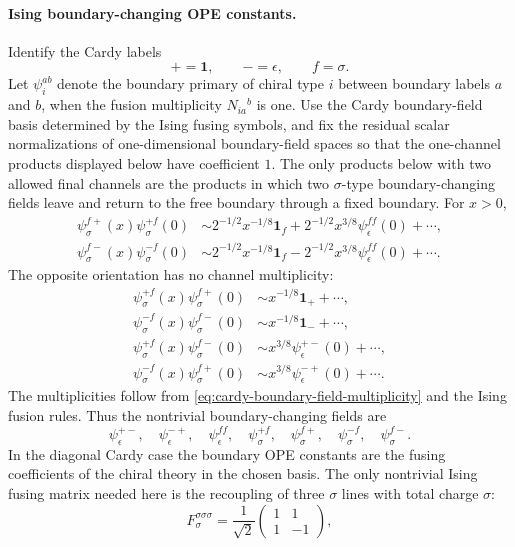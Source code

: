 \paragraph{Ising boundary-changing OPE constants.}
Identify the Cardy labels
\[
  +=\mathbf 1,\qquad -=\epsilon,\qquad f=\sigma .
\]
Let \(\psi_i^{ab}\) denote the boundary primary of chiral type \(i\) between
boundary labels \(a\) and \(b\), when the fusion multiplicity
\(N_{ia}{}^b\) is one.  Use the Cardy boundary-field basis determined by the
Ising fusing symbols, and fix the residual scalar normalizations of
one-dimensional boundary-field spaces so that the one-channel products
displayed below have coefficient \(1\).  The only products below with two
allowed final channels are the products in which two \(\sigma\)-type
boundary-changing fields leave and return to the free boundary through a
fixed boundary.  For \(x>0\),
\begin{align}
  \psi_\sigma^{f+}(x)\psi_\sigma^{+f}(0)
  &\sim
  2^{-1/2}x^{-1/8}\mathbf 1_f
  +
  2^{-1/2}x^{3/8}\psi_\epsilon^{ff}(0)+\cdots ,
  \label{eq:ising-bcc-plus-through-free}\\
  \psi_\sigma^{f-}(x)\psi_\sigma^{-f}(0)
  &\sim
  2^{-1/2}x^{-1/8}\mathbf 1_f
  -
  2^{-1/2}x^{3/8}\psi_\epsilon^{ff}(0)+\cdots .
  \label{eq:ising-bcc-minus-through-free}
\end{align}
The opposite orientation has no channel multiplicity:
\begin{align}
  \psi_\sigma^{+f}(x)\psi_\sigma^{f+}(0)
  &\sim x^{-1/8}\mathbf 1_+ +\cdots,\\
  \psi_\sigma^{-f}(x)\psi_\sigma^{f-}(0)
  &\sim x^{-1/8}\mathbf 1_- +\cdots,\\
  \psi_\sigma^{+f}(x)\psi_\sigma^{f-}(0)
  &\sim x^{3/8}\psi_\epsilon^{+-}(0)+\cdots,\\
  \psi_\sigma^{-f}(x)\psi_\sigma^{f+}(0)
  &\sim x^{3/8}\psi_\epsilon^{-+}(0)+\cdots .
\end{align}
The multiplicities follow from
\eqref{eq:cardy-boundary-field-multiplicity} and the Ising fusion rules.
Thus the nontrivial boundary-changing fields are
\[
  \psi_\epsilon^{+-},\quad \psi_\epsilon^{-+},\quad
  \psi_\epsilon^{ff},\quad
  \psi_\sigma^{+f},\quad \psi_\sigma^{f+},\quad
  \psi_\sigma^{-f},\quad \psi_\sigma^{f-}.
\]
In the diagonal Cardy case the boundary OPE constants are the fusing
coefficients of the chiral theory in the chosen basis.  The only
nontrivial Ising fusing matrix needed here is the recoupling of three
\(\sigma\) lines with total charge \(\sigma\):
\begin{equation}
  F^{\sigma\sigma\sigma}_{\sigma}
  =
  \frac1{\sqrt2}
  \begin{pmatrix}
    1&1\\
    1&-1
  \end{pmatrix},
  \label{eq:ising-f-symbol-sigma-sigma-sigma}
\end{equation}
